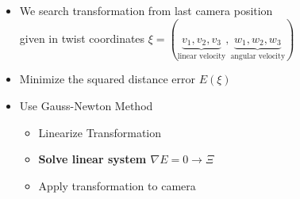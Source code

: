 \documentclass{beamer}
\begin{document}
{\begin{columns}
\begin{figure}
                        \end{figure}
                        \begin{itemize}
                            \item We search transformation from last camera position\\
                            given in twist coordinates $\xi = (\underbrace{v_1, v_2, v_3}_{\text{linear velocity}}, \underbrace{w_1, w_2, w_3}_{\text{angular velocity}})$
                            \item Minimize the squared distance error $E(\xi)$
                            \item Use Gauss-Newton Method
                            \begin{itemize}
                                  \item Linearize Transformation
                                  \item \textbf{Solve linear system $\nabla E = 0 \to \Xi$}
                                  \item Apply transformation to camera
                            \end{itemize}
                \end{itemize}
        \end{columns}
}
\end{document}
